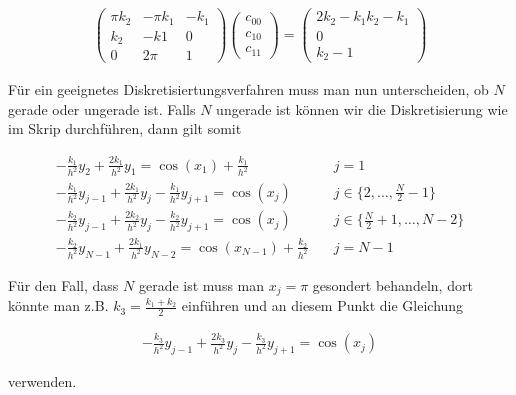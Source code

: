 \begin{solution}
\begin{itemize}
    \begin{align*}
      \left( \begin{array}{ccc}
        \pi k_2 & -\pi k_1 & - k_1 \\
        k_2 & -k1 & 0 \\
        0 & 2\pi & 1
      \end{array}
      \right) \left(
      \begin{array}{c}
        c_{00} \\
        c_{10} \\
        c_{11}
      \end{array}
      \right)
      =
      \left(
      \begin{array}{c}
      2k_2 - k_1 k_2 - k_1 \\
      0 \\
      k_2 - 1
      \end{array}
      \right)
    \end{align*}

    Für ein geeignetes Diskretisiertungsverfahren muss man nun unterscheiden, ob
    $N$ gerade oder ungerade ist. Falls $N$ ungerade ist können wir die Diskretisierung
    wie im Skrip durchführen, dann gilt somit

    \begin{align*}
      -\frac{k_1}{h^2} y_2 + \frac{2k_1}{h^2} y_1
      =
      \cos(x_1) + \frac{k_1}{h^2}
      \quad
      & j = 1 \\
      -\frac{k_1}{h^2} y_{j-1} + \frac{2k_1}{h^2} y_j - \frac{k_1}{h^2}y_{j+1}
      =
      \cos(x_j)
      \quad
      &j \in \{2, \dots, \frac{N}{2}-1\} \\
      -\frac{k_2}{h^2} y_{j-1} + \frac{2k_2}{h^2} y_j - \frac{k_2}{h^2}y_{j+1}
      =
      \cos(x_j)
      \quad
      &j \in \{\frac{N}{2}+1, \dots , N-2\} \\
      -\frac{k_2}{h^2} y_{N-1} + \frac{2k_1}{h^2} y_{N-2}
      =
      \cos(x_{N-1})+ \frac{k_2}{h^2}
      \quad
      & j = N-1
    \end{align*}

    Für den Fall, dass $N$ gerade ist muss man $x_j = \pi$ gesondert behandeln, dort
    könnte man z.B. $k_3 = \frac{k_1 +k_2}{2}$ einführen und an diesem Punkt die Gleichung

    \begin{align*}
    -\frac{k_3}{h^2} y_{j-1} + \frac{2k_3}{h^2} y_j - \frac{k_3}{h^2}y_{j+1}
    =
    \cos(x_j)
    \end{align*}

    verwenden.
  \end{itemize}
\end{solution}
